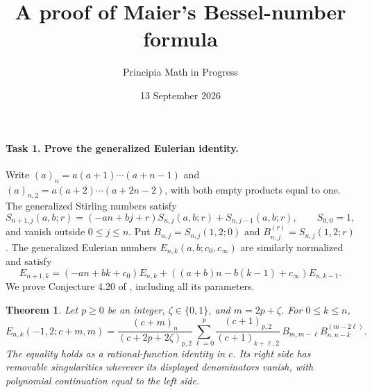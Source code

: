 \documentclass[10pt]{article}
\title{A proof of Maier's Bessel-number formula}
\author{Principia Math in Progress}
\date{13 September 2026}
\newtheorem{theorem}{Theorem}
\newcommand{\rise}[2]{(#1)_{#2}}
\newcommand{\step}[2]{(#1)_{#2,2}}
\begin{document}
\maketitle
\paragraph{Task 1. Prove the generalized Eulerian identity.}
Write \(\rise an=a(a+1)\cdots(a+n-1)\) and
\(\step an=a(a+2)\cdots(a+2n-2)\), with both empty products equal to one.
The generalized Stirling numbers satisfy
\[
 S_{n+1,j}(a,b;r)=(-an+bj+r)S_{n,j}(a,b;r)+S_{n,j-1}(a,b;r),
 \qquad S_{0,0}=1,
\]
and vanish outside \(0\le j\le n\). Put
\(B_{n,j}=S_{n,j}(1,2;0)\) and \(B^{(r)}_{n,j}=S_{n,j}(1,2;r)\).
The generalized Eulerian numbers \(E_{n,k}(a,b;c_0,c_\infty)\)
are similarly normalized and satisfy
\[
 E_{n+1,k}=(-an+bk+c_0)E_{n,k}
             +((a+b)n-b(k-1)+c_\infty)E_{n,k-1}.
 \tag{1}
\]
We prove Conjecture 4.20 of \cite{Maier}, including all its parameters.

\begin{theorem}
Let \(p\ge0\) be an integer, \(\zeta\in\{0,1\}\), and \(m=2p+\zeta\).
For \(0\le k\le n\),
\[
 E_{n,k}(-1,2;c+m,m)=
 \frac{\rise{c+m}n}{\step{c+2p+2\zeta}p}
 \sum_{\ell=0}^p
 \frac{\step{c+1}p}{\step{c+1}{k+\ell}}\,
 B_{m,m-\ell}B^{(m-2\ell)}_{n,n-k}.
 \tag{2}
\]
The equality holds as a rational-function identity in \(c\).
Its right side has removable singularities wherever its displayed
denominators vanish, with polynomial continuation equal to the left side.
\end{theorem}
\end{document}
